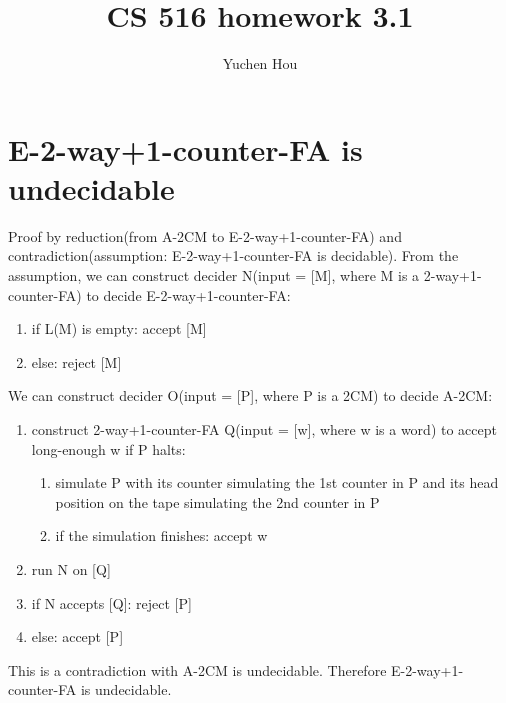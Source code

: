 \documentclass{article}
\begin{document}
\lstset{language=python, tabsize=4}
\title{CS 516 homework 3.1}
\author{Yuchen Hou}
\maketitle

\section{E-2-way+1-counter-FA is undecidable}
Proof by reduction(from A-2CM to E-2-way+1-counter-FA) and contradiction(assumption: E-2-way+1-counter-FA is decidable). From the assumption, we can construct decider N(input = [M], where M is a 2-way+1-counter-FA) to decide E-2-way+1-counter-FA:
\begin{enumerate}
	\item if L(M) is empty: accept [M]
	\item else: reject [M]
\end{enumerate}
We can construct decider O(input = [P], where P is a 2CM) to decide A-2CM:
\begin{enumerate}
	\item construct 2-way+1-counter-FA Q(input = [w], where w is a word) to 
	accept long-enough w if P halts:
	\begin{enumerate}
		\item simulate P with its counter simulating the 1st counter in P and its head position on the tape simulating the 2nd counter in P
		\item if the simulation finishes: accept w
	\end{enumerate}
	\item run N on [Q]
	\item if N accepts [Q]: reject [P]
	\item else: accept [P]
\end{enumerate}
This is a contradiction with A-2CM is undecidable. Therefore E-2-way+1-counter-FA is undecidable.
\end{document}
